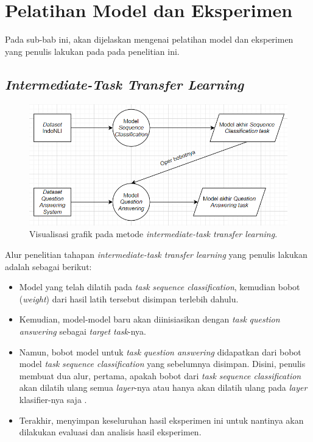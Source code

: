 \section{Pelatihan Model dan Eksperimen}
\label{3.4}
Pada sub-bab ini, akan dijelaskan mengenai pelatihan model dan eksperimen yang penulis lakukan pada pada penelitian ini. 

\subsection{\emph{Intermediate-Task Transfer Learning}}
\label{3.4.1}

\begin{figure}[h]
\includegraphics[width=\linewidth]{assets/pics/alur1.png}
\centering
\caption{Visualisasi grafik pada metode \emph{intermediate-task transfer learning}.}
\end{figure}

Alur penelitian tahapan \emph{intermediate-task transfer learning} yang penulis lakukan adalah sebagai berikut:

\begin{itemize}

    \item Model yang telah dilatih pada \emph{task} \emph{sequence classification}, kemudian bobot (\emph{weight}) dari hasil latih tersebut disimpan terlebih dahulu.

    \item Kemudian, model-model baru akan diinisiasikan dengan \emph{task} \emph{question answering} sebagai \emph{target task}-nya.

    \item Namun, bobot model untuk \emph{task} \emph{question answering} didapatkan dari bobot model \emph{task} \emph{sequence classification} yang sebelumnya disimpan. Disini, penulis membuat dua alur, pertama, apakah bobot dari  \emph{task} \emph{sequence classification} akan dilatih ulang semua \emph{layer}-nya atau hanya akan dilatih ulang pada \emph{layer} klasifier-nya saja \citep{lee2019elsa}.

    \item Terakhir, menyimpan keseluruhan hasil eksperimen ini untuk nantinya akan dilakukan evaluasi dan analisis hasil eksperimen.

\end{itemize}

